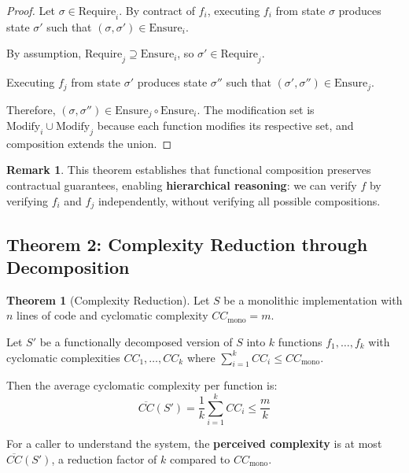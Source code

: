 \documentclass[a4paper,12pt]{article}
\theoremstyle{definition}
\newtheorem{theorem}{Theorem}
\newtheorem{remark}{Remark}
\begin{document}
\begin{proof}
Let $\sigma \in \mathrm{Require}_i$. By contract of $f_i$, executing $f_i$ from state $\sigma$ produces state $\sigma'$ such that $(\sigma, \sigma') \in \mathrm{Ensure}_i$.

By assumption, $\mathrm{Require}_j \supseteq \mathrm{Ensure}_i$, so $\sigma' \in \mathrm{Require}_j$.

Executing $f_j$ from state $\sigma'$ produces state $\sigma''$ such that $(\sigma', \sigma'') \in \mathrm{Ensure}_j$.

Therefore, $(\sigma, \sigma'') \in \mathrm{Ensure}_j \circ \mathrm{Ensure}_i$. The modification set is $\mathrm{Modify}_i \cup \mathrm{Modify}_j$ because each function modifies its respective set, and composition extends the union. \qedhere
\end{proof}

\begin{remark}
This theorem establishes that functional composition preserves contractual guarantees, enabling \textbf{hierarchical reasoning}: we can verify $f$ by verifying $f_i$ and $f_j$ independently, without verifying all possible compositions.
\end{remark}

\subsection{Theorem 2: Complexity Reduction through Decomposition}

\begin{theorem}[Complexity Reduction]
\label{thm:complexity_reduction}
Let $S$ be a monolithic implementation with $n$ lines of code and cyclomatic complexity $CC_{\mathrm{mono}} = m$. 

Let $S'$ be a functionally decomposed version of $S$ into $k$ functions $f_1, \ldots, f_k$ with cyclomatic complexities $CC_1, \ldots, CC_k$ where $\sum_{i=1}^{k} CC_i \leq CC_{\mathrm{mono}}$.

Then the average cyclomatic complexity per function is:
\[
\overline{CC}(S') = \frac{1}{k} \sum_{i=1}^{k} CC_i \leq \frac{m}{k}
\]

For a caller to understand the system, the \textbf{perceived complexity} is at most $\overline{CC}(S')$, a reduction factor of $k$ compared to $CC_{\mathrm{mono}}$.
\end{theorem}
\end{document}
